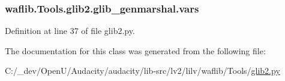 \subsubsection[{\texorpdfstring{vars}{vars}}]{\setlength{\rightskip}{0pt plus 5cm}waflib.\+Tools.\+glib2.\+glib\+\_\+genmarshal.\+vars\hspace{0.3cm}{\ttfamily [static]}}\hypertarget{classwaflib_1_1_tools_1_1glib2_1_1glib__genmarshal_acebb16a781a2c845a5f1d95cd8684210}{}\label{classwaflib_1_1_tools_1_1glib2_1_1glib__genmarshal_acebb16a781a2c845a5f1d95cd8684210}


Definition at line 37 of file glib2.\+py.



The documentation for this class was generated from the following file\+:\begin{DoxyCompactItemize}
\item 
C\+:/\+\_\+dev/\+Open\+U/\+Audacity/audacity/lib-\/src/lv2/lilv/waflib/\+Tools/\hyperlink{lilv_2waflib_2_tools_2glib2_8py}{glib2.\+py}\end{DoxyCompactItemize}

